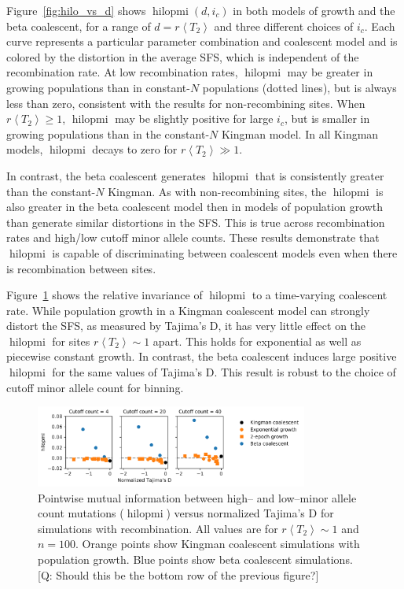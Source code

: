 \documentclass[11pt, letterpaper]{article}   	%
\newcommand{\Fig}[1]{Figure~\ref{#1}}
\newcommand{\E}[1]{\left< #1 \right>}
\DeclareMathOperator{\hilopmi}{hilopmi}
\begin{document}
\Fig{fig:hilo_vs_d} shows $\hilopmi(d,i_c)$ in both models of growth and the beta coalescent, for a range of $d=r\E{T_2}$ and three different choices of $i_c$.
Each curve represents a particular parameter combination and coalescent model and is colored by the distortion in the average SFS, which is independent of the recombination rate.
At low recombination rates, $\hilopmi$ may be greater in growing populations than in constant-$N$ populations (dotted lines), but is always less than zero, consistent with the results for non-recombining sites.
When $r\E{T_2}\geq 1$, $\hilopmi$ may be slightly positive for large $i_c$, but is smaller in growing populations than in the constant-$N$ Kingman model.
In all Kingman models, $\hilopmi$ decays to zero for $r\E{T_2}\gg 1$.

In contrast, the beta coalescent generates $\hilopmi$ that is consistently greater than the constant-$N$ Kingman.
As with non-recombining sites, the $\hilopmi$ is also greater in the beta coalescent model then in models of population growth than generate similar distortions in the SFS.
This is true across recombination rates and high/low cutoff minor allele counts.
These results demonstrate that $\hilopmi$ is capable of discriminating between coalescent models even when there is recombination between sites.

\Fig{fig:hilo_vs_tajD} shows the relative invariance of $\hilopmi$ to a time-varying coalescent rate.
While population growth in a Kingman coalescent model can strongly distort the SFS, as measured by Tajima's D, it has very little effect on the $\hilopmi$ for sites $r \E{T_2} \sim 1$ apart.
This holds for exponential as well as piecewise constant growth.
In contrast, the beta coalescent induces large positive $\hilopmi$ for the same values of Tajima's D.
This result is robust to the choice of cutoff minor allele count for binning.

\begin{figure}
\centering
\includegraphics[width=0.8\textwidth]{figures/hilopmi_vs_tajimasD_recombination.pdf}
\caption{Pointwise mutual information between high-- and low--minor allele count mutations ($\hilopmi$) versus normalized Tajima's D for simulations with recombination. All values are for $r \E{T_2} \sim 1$ and $n=100$. Orange points show Kingman coalescent simulations with population growth. Blue points show beta coalescent simulations. [Q: Should this be the bottom row of the previous figure?] \label{fig:hilo_vs_tajD}}
\end{figure}
\end{document}
